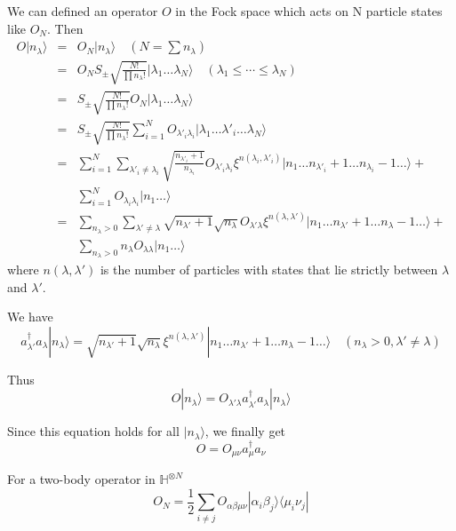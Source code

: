 \documentclass[12pt]{book}
\begin{document}
	We can defined an operator $O$ in the Fock space which acts on N particle states like $O_N$. Then
	\begin{eqnarray}
		O|n_\lambda\rangle&=&O_N|n_\lambda\rangle\quad (N=\sum n_\lambda)\\
		&=&O_NS_\pm\sqrt{\frac{N!}{\prod n_\lambda!}}|\lambda_1\dots\lambda_N\rangle\quad (\lambda_1\leq\cdots\leq\lambda_N)\\
		&=&S_\pm\sqrt{\frac{N!}{\prod n_\lambda!}}O_N|\lambda_1\dots\lambda_N\rangle\\
		&=&S_\pm\sqrt{\frac{N!}{\prod n_\lambda!}}\sum_{i=1}^NO_{\lambda'_i\lambda_i}|\lambda_1\dots\lambda'_i\dots\lambda_N\rangle\\
		&=&\sum_{i=1}^N\sum_{\lambda'_i\neq\lambda_i}\sqrt{\frac{n_{\lambda'_i}+1}{n_{\lambda_i}}}O_{\lambda'_i\lambda_i}\xi^{n(\lambda_i,\lambda'_i)}|n_1\dots n_{\lambda'_i}+1\dots n_{\lambda_i}-1\dots\rangle+\nonumber\\
		&&\sum_{i=1}^NO_{\lambda_i\lambda_i}|n_1\dots \rangle\\
		&=&\sum_{n_\lambda>0}\sum_{\lambda'\neq\lambda}\sqrt{n_{\lambda'}+1}\sqrt{n_\lambda}O_{\lambda'\lambda}\xi^{n(\lambda,\lambda')}|n_1\dots n_{\lambda'}+1\dots n_\lambda-1\dots\rangle+\nonumber\\
		&&\sum_{n_\lambda>0}n_\lambda O_{\lambda\lambda}|n_1\dots \rangle
	\end{eqnarray}
	where $n(\lambda,\lambda')$ is the number of particles with states that lie strictly between $\lambda$ and $\lambda'$.
	
	We have
	\begin{equation}
		a_{\lambda'}^\dagger a_\lambda|n_\lambda\rangle=\sqrt{n_{\lambda'}+1}\sqrt{n_\lambda}\xi^{n(\lambda,\lambda')}|n_1\dots n_{\lambda'}+1\dots n_\lambda-1\dots\rangle\quad(n_\lambda>0,\lambda'\neq\lambda)
	\end{equation}
	
	Thus
	\begin{equation}
		O|n_\lambda\rangle=O_{\lambda'\lambda} a_{\lambda'}^\dagger a_\lambda|n_\lambda\rangle
	\end{equation}
	
	Since this equation holds for all $|n_\lambda\rangle$, we finally get
	\begin{equation}
		O=O_{\mu\nu}a_\mu^\dagger a_\nu
	\end{equation}
	
	For a two-body operator in $\mathbb H^{\otimes N}$
	\begin{equation}
		O_N=\frac 12\sum_{i\neq j}O_{\alpha\beta\mu\nu}|\alpha_i\beta_j\rangle\langle\mu_i\nu_j|
	\end{equation}
	
\end{document}
